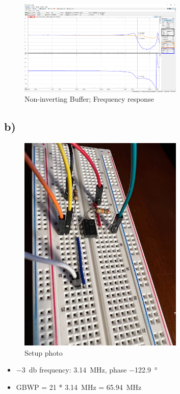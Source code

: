\documentclass{article}
\begin{document}
	\begin{figure}[H]
	    \centering
	    \includegraphics[width=0.7\textwidth]{2a-2}
	    \caption{Non-inverting Buffer; Frequency response}
	\end{figure}
	
	\subsection*{b)}
	
	\begin{figure}[H]
	    \centering
	    \includegraphics[width=0.7\textwidth]{2b-photo}
	    \caption{Setup photo}
	\end{figure}

	\begin{itemize}
		\item \SI{-3}{\decibel} frequency: \SI{3.14}{\mega\hertz}, phase \SI{-122.9}{\degree}
		\item GBWP = 21 * \SI{3.14}{\mega\hertz} = \SI{65.94}{\mega\hertz}
	\end{itemize}
	
\end{document}
